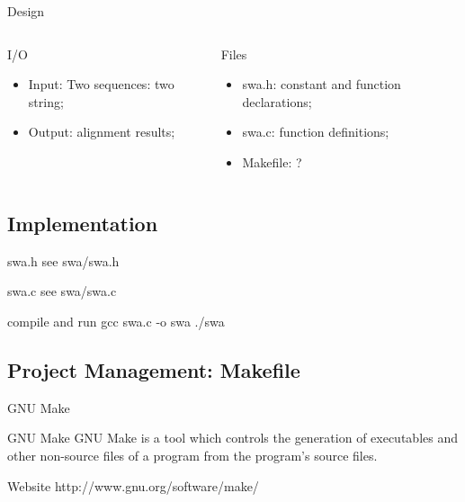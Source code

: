 \documentclass[UTF8]{beamer}
\begin{document}
\begin{frame}[t]{Design}
\begin{columns}
  \begin{column}{.5\textwidth}
\begin{block}{I/O}
  \begin{itemize}
    \item Input: Two sequences: two string;
    \item Output: alignment results;
  \end{itemize}
\end{block}
\end{column}

\begin{column}{.5\textwidth}
\begin{block}{Files}
  \begin{itemize}
    \item swa.h: constant and function declarations;
    \item swa.c: function definitions;
    \item Makefile: ?
  \end{itemize}
\end{block}
\end{column}
\end{columns}
\end{frame}

\subsection{Implementation}
\begin{frame}[t]{swa.h}
  see swa/swa.h
\end{frame}

\begin{frame}[t]{swa.c}
  see swa/swa.c
\end{frame}

\begin{frame}[t]{compile and run}
  gcc swa.c -o swa
  ./swa
\end{frame}

\subsection{Project Management: Makefile}

\begin{frame}[t]{GNU Make}
\begin{block}{GNU Make}
  GNU Make is a tool which controls the generation of executables and other
  non-source files of a program from the program's source files.
\end{block}
\begin{block}{Website}
  http://www.gnu.org/software/make/
\end{block}
\end{frame}
\end{document}
